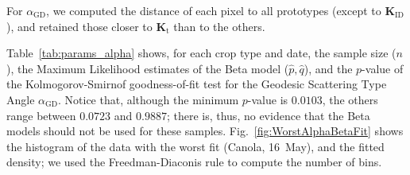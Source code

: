 \documentclass[journal]{IEEEtran}
\begin{document}
For $\alpha_{\text{GD}}$, we computed the distance of each pixel to all prototypes (except to $\bm K_{\text{ID}}$), and retained those closer to $\bm K_{\text{t}}$ than to the others.

Table~\ref{tab:params_alpha} shows, for each crop type and date, 
the sample size ($n$), 
the Maximum Likelihood estimates of the Beta model ($\widehat p,\widehat q$), and the $p$-value of the Kolmogorov-Smirnof goodness-of-fit test for the Geodesic Scattering Type Angle $\alpha_{\text{GD}}$.
Notice that, although the minimum $p$-value is $0.0103$, the others range between $0.0723$ and $0.9887$; there is, thus, no evidence that the Beta models should not be used for these samples.
Fig.~\ref{fig:WorstAlphaBetaFit} shows the histogram of the data with the worst fit (Canola, 16~May), and the fitted density; we used the Freedman-Diaconis rule to compute the number of bins.
\end{document}
